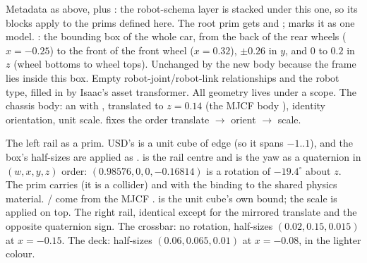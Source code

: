 
\begin{explain}
 Metadata as above, plus :
  the robot-schema layer is stacked under this one, so its 
  blocks apply to the prims defined here.
 The root prim gets  and
  ;  marks it as one model.
 : the bounding box of the whole car, from the back
  of the rear wheels ($x=-0.25$) to the front of the front wheel
  ($x=0.32$), $\pm0.26$ in $y$, and $0$ to $0.2$ in $z$ (wheel bottoms to
  wheel tops). Unchanged by the new body because the frame lies inside this
  box.
 Empty robot-joint/robot-link relationships and the robot type,
  filled in by Isaac's asset transformer.
 All geometry lives under a  scope.
 The chassis body: an  with ,
  translated to $z=0.14$ (the MJCF body ), identity orientation,
  unit scale.  fixes the order translate $\to$ orient
  $\to$ scale.
\end{explain}


\begin{explain}
 The left rail as a  prim. USD's  is a
  unit cube of edge  (so it spans $-1..1$), and the box's
  half-sizes are applied as .
   is the rail centre and  is
  the yaw as a quaternion in $(w, x, y, z)$ order: $(0.98576, 0, 0,
  -0.16814)$ is a rotation of $-19.4^\circ$ about $z$. The prim carries
   (it is a collider) and
   with the binding to the shared physics material.
  / come from the MJCF
  .  is the unit cube's own bound; the scale is
  applied on top.
 The right rail, identical except for the mirrored translate and
  the opposite quaternion sign.
 The crossbar: no rotation, half-sizes $(0.02, 0.15, 0.015)$
  at $x=-0.15$.
 The deck: half-sizes $(0.06, 0.065, 0.01)$ at $x=-0.08$, in
  the lighter colour.
\end{explain}


